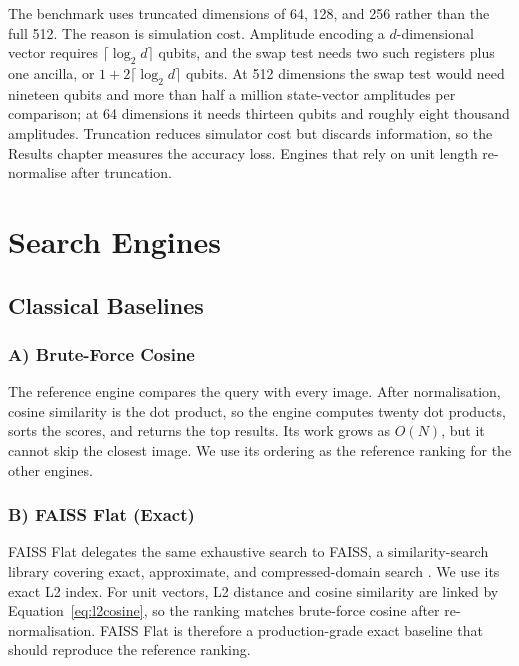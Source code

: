 The benchmark uses truncated dimensions of 64, 128, and 256 rather than the full
512. The reason is simulation cost. Amplitude encoding a $d$-dimensional vector
requires $\lceil \log_2 d \rceil$ qubits, and the swap test needs two such
registers plus one ancilla, or $1 + 2\lceil \log_2 d \rceil$ qubits. At 512
dimensions the swap test would need nineteen qubits and more than half a million
state-vector amplitudes per comparison; at 64 dimensions it needs thirteen
qubits and roughly eight thousand amplitudes. Truncation reduces simulator cost
but discards information, so the Results chapter measures the accuracy loss.
Engines that rely on unit length re-normalise after truncation.

\section{Search Engines}
\label{sec:method:engines}


\subsection{Classical Baselines}
\subsubsection{A) Brute-Force Cosine}
The reference engine compares the query with every image. After normalisation,
cosine similarity is the dot product, so the engine computes twenty dot products,
sorts the scores, and returns the top results. Its work grows as $O(N)$, but it
cannot skip the closest image. We use its ordering as the reference ranking for
the other engines.

\subsubsection{B) FAISS Flat (Exact)}
FAISS Flat delegates the same exhaustive search to FAISS, a similarity-search
library covering exact, approximate, and compressed-domain search
\cite{johnson2019faiss}. We use its exact L2 index. For unit vectors, L2 distance
and cosine similarity are linked by Equation~\ref{eq:l2cosine}, so the ranking
matches brute-force cosine after re-normalisation. FAISS Flat is therefore a
production-grade exact baseline that should reproduce the reference ranking.

